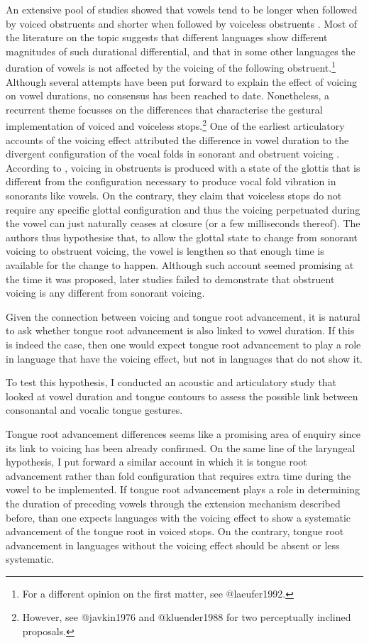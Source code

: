 \documentclass[authoryear, twocolumn]{elsarticle}
\begin{document}
An extensive pool of studies showed that vowels tend to be longer when
followed by voiced obstruents and shorter when followed by voiceless
obstruents \citep{house1953, chen1970, klatt1973, lisker1973}. Most of
the literature on the topic suggests that different languages show
different magnitudes of such durational differential, and that in some
other languages the duration of vowels is not affected by the voicing of
the following
obstruent.\footnote{For a different opinion on the first matter, see @laeufer1992.}
Although several attempts have been put forward to explain the effect of
voicing on vowel durations, no consensus has been reached to date.
Nonetheless, a recurrent theme focusses on the differences that
characterise the gestural implementation of voiced and voiceless
stops.\footnote{However, see @javkin1976 and @kluender1988 for two perceptually inclined proposals.}
One of the earliest articulatory accounts of the voicing effect
attributed the difference in vowel duration to the divergent
configuration of the vocal folds in sonorant and obstruent voicing
\citetext{\citealp{halle1967}; \citealp[reiterated in][]{chomsky1968}}.
According to \citet{halle1967}, voicing in obstruents is produced with a
state of the glottis that is different from the configuration necessary
to produce vocal fold vibration in sonorants like vowels. On the
contrary, they claim that voiceless stops do not require any specific
glottal configuration and thus the voicing perpetuated during the vowel
can just naturally ceases at closure (or a few milliseconds thereof).
The authors thus hypothesise that, to allow the glottal state to change
from sonorant voicing to obstruent voicing, the vowel is lengthen so
that enough time is available for the change to happen. Although such
account seemed promising at the time it was proposed, later studies
failed to demonstrate that obstruent voicing is any different from
sonorant voicing.

Given the connection between voicing and tongue root advancement, it is
natural to ask whether tongue root advancement is also linked to vowel
duration. If this is indeed the case, then one would expect tongue root
advancement to play a role in language that have the voicing effect, but
not in languages that do not show it.

To test this hypothesis, I conducted an acoustic and articulatory study
that looked at vowel duration and tongue contours to assess the possible
link between consonantal and vocalic tongue gestures.

Tongue root advancement differences seems like a promising area of
enquiry since its link to voicing has been already confirmed. On the
same line of the laryngeal hypothesis, I put forward a similar account
in which it is tongue root advancement rather than fold configuration
that requires extra time during the vowel to be implemented. If tongue
root advancement plays a role in determining the duration of preceding
vowels through the extension mechanism described before, than one
expects languages with the voicing effect to show a systematic
advancement of the tongue root in voiced stops. On the contrary, tongue
root advancement in languages without the voicing effect should be
absent or less systematic.
\end{document}

